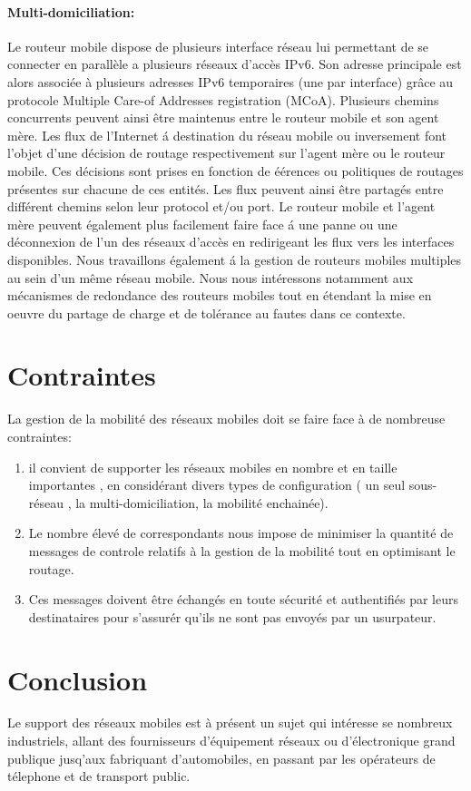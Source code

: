 \documentclass[12pt]{article}
\begin{document}
\paragraph{Multi-domiciliation:} 
Le routeur mobile dispose de plusieurs interface r\'{e}seau lui permettant de se connecter en parall\`{e}le a plusieurs r\'{e}seaux d'acc\`{e}s IPv6. Son adresse principale est alors associ\'{e}e \`{a} plusieurs adresses IPv6 temporaires (une par interface) gr\^{a}ce au protocole Multiple Care-of Addresses registration (MCoA). Plusieurs chemins concurrents peuvent ainsi \^{e}tre maintenus entre le routeur mobile et son agent m\`{e}re.
Les flux de l'Internet \'{a} destination du r\'{e}seau mobile ou inversement font l'objet d'une d\'{e}cision de routage respectivement sur l'agent m\`{e}re ou le routeur mobile. Ces d\'{e}cisions sont prises en fonction de \'{e}\'{e}rences ou politiques de routages pr\'{e}sentes sur chacune de ces entit\'{e}s.
Les flux peuvent ainsi \^{e}tre partag\'{e}s entre diff\'{e}rent chemins selon leur protocol et/ou port. Le routeur mobile et l'agent m\`{e}re peuvent \'{e}galement plus facilement faire face \'{a} une panne ou une d\'{e}connexion de l'un des r\'{e}seaux d'acc\`{e}s en redirigeant les flux vers les interfaces disponibles.
Nous travaillons \'{e}galement \'{a} la gestion de routeurs mobiles multiples au sein d'un m\^{e}me r\'{e}seau mobile. Nous nous int\'{e}ressons notamment aux m\'{e}canismes de redondance des routeurs mobiles tout en \'{e}tendant la mise en oeuvre du partage de charge et de tol\'{e}rance au fautes dans ce contexte.

\newpage
\section{Contraintes}
La gestion de la mobilit\'e des r\'eseaux mobiles doit se faire face \`a de nombreuse contraintes:
\begin{enumerate}
  \item il convient de supporter les r\'eseaux mobiles en nombre et en taille importantes , en consid\'erant divers types de configuration ( un seul sous-r\'eseau , la multi-domiciliation, la mobilit\'e enchain\'ee).
  \item Le nombre \'elev\'e de correspondants nous impose de minimiser la quantit\'e de messages de controle relatifs \`a la gestion de la mobilit\'e tout en optimisant le routage.
  \item Ces messages doivent \^etre \'echang\'es en toute s\'ecurit\'e et authentifi\'es par leurs destinataires pour s'assur\'er qu'ils ne sont pas envoy\'es par un usurpateur. 
\end{enumerate}

\section{Conclusion}
Le support des r\'eseaux mobiles est \`a pr\'esent un sujet qui int\'eresse se nombreux industriels, allant des fournisseurs
 d'\'equipement r\'eseaux ou d'\'electronique grand publique jusq'aux fabriquant d'automobiles, en passant par les op\'erateurs de t\'elephone et de transport public.
\end{document}
